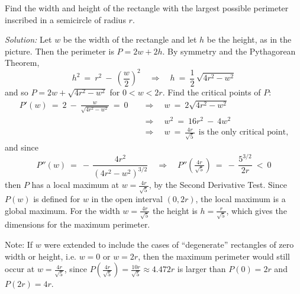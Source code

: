 \divider
\newpage
\begin{exmp}\label{exmp:minmax7}
\noindent Find the width and height of the rectangle with the
largest possible perimeter inscribed in a semicircle of radius $r$.
 \par\noindent\emph{Solution:} Let $w$ be the width of the rectangle and let
 $h$ be the height, as in the picture. Then the perimeter is $P= 2w + 2h$.
 By symmetry and the Pythagorean Theorem,
\[
h^2 ~=~ r^2 ~-~ \left(\frac{w}{2}\right)^2 \quad\Rightarrow\quad
h ~=~ \frac{1}{2}\,\sqrt{4r^2 - w^2}
\]
and so $P = 2w + \sqrt{4r^2 - w^2}$ for $0 < w < 2r$. Find the critical points
of $P$:
\begin{align*}
P'(w) ~=~ 2 ~-~ \frac{w}{\sqrt{4r^2 - w^2}} ~=~ 0 \quad&\Rightarrow\quad
w ~=~ 2\sqrt{4r^2 - w^2}\\[2pt]
&\Rightarrow\quad w^2 ~=~ 16r^2 ~-~ 4w^2\\[2pt]
&\Rightarrow\quad w ~=~ \frac{4r}{\sqrt{5}} ~~\text{is the only critical point,}
\end{align*}
and since
\[
P''(w) ~=~ -\,\frac{4r^2}{(4r^2 - w^2)^{3/2}} \quad\Rightarrow\quad
P''\left(\tfrac{4r}{\sqrt{5}}\right) ~=~ -\,\frac{5^{3/2}}{2r} ~<~ 0
\]
then $P$ has a local maximum at $w=\frac{4r}{\sqrt{5}}$, by the Second
Derivative Test. Since $P(w)$ is defined for $w$ in the open interval $(0,2r)$,
the local maximum is a global maximum. For the width $w=\frac{4r}{\sqrt{5}}$ the
height is $h=\frac{r}{\sqrt{5}}$, which gives the dimensions for the maximum
perimeter.\vspace{2mm}

\par\noindent Note: If $w$ were extended to include the cases of ``degenerate''
rectangles of zero width or height, i.e. $w=0$ or $w=2r$, then the maximum
perimeter would still occur at $w=\tfrac{4r}{\sqrt{5}}$, since
$P\left(\tfrac{4r}{\sqrt{5}}\right) = \tfrac{10r}{\sqrt{5}} \approx 4.472r$
is larger than $P(0) = 2r$ and $P(2r) = 4r$.
\end{exmp}
\divider
\vspace{2mm}

